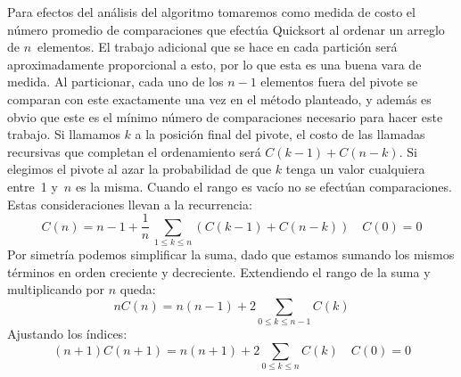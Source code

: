   Para efectos del análisis del algoritmo
  tomaremos como medida de costo el número promedio de comparaciones
  que efectúa Quicksort al ordenar un arreglo de \(n\)~elementos.
  El trabajo adicional que se hace en cada partición
  será aproximadamente proporcional a esto,
  por lo que esta es una buena vara de medida.
  Al particionar,
  cada uno de los \(n - 1\) elementos fuera del pivote
  se comparan con este exactamente una vez en el método planteado,
  y además es obvio que este es el mínimo número de comparaciones necesario
  para hacer este trabajo.
  Si llamamos \(k\) a la posición final del pivote,
  el costo de las llamadas recursivas que completan el ordenamiento
  será \(C(k - 1) + C(n - k)\).
  Si elegimos el pivote al azar
  la probabilidad de que \(k\) tenga un valor cualquiera entre~\num{1}
  y~\(n\) es la misma.
  Cuando el rango es vacío no se efectúan comparaciones.
  Estas consideraciones llevan a la recurrencia:
  \begin{equation*}
    C(n)
       =  n - 1 +
           \frac{1}{n} \, \sum_{1 \le k \le n}
              \left(C(k - 1) + C(n - k)\right) \quad C(0)  = 0
  \end{equation*}
  Por simetría podemos simplificar la suma,
  dado que estamos sumando los mismos términos
  en orden creciente y decreciente.
  Extendiendo el rango de la suma y multiplicando por \(n\) queda:
  \begin{equation*}
    n C(n)
      = n (n - 1) + 2 \sum_{0 \le k \le n - 1} C(k)
  \end{equation*}
  Ajustando los índices:
  \begin{equation*}
    (n + 1) C(n + 1)
      = n (n + 1) + 2 \sum_{0 \le k \le n} C(k) \quad C(0) = 0
  \end{equation*}

